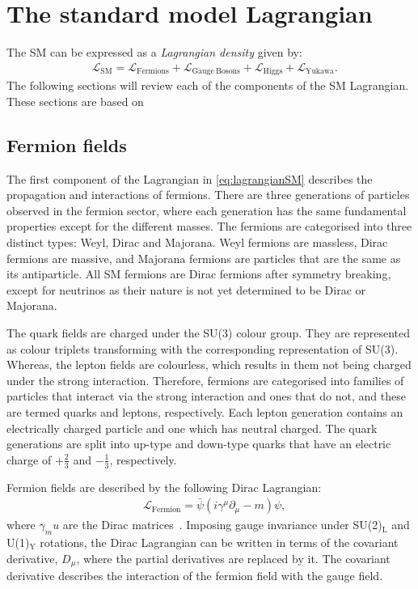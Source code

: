 \section{The standard model Lagrangian}
The SM can be expressed as a \emph{Lagrangian density} given by:
\begin{equation}
    \label{eq:lagrangianSM}
    \begin{aligned}
        & \mathcal{L}_\mathrm{SM} = \mathcal{L}_\mathrm{Fermions} + \mathcal{L}_\mathrm{Gauge~Bosons} + \mathcal{L}_\mathrm{Higgs} + \mathcal{L}_\mathrm{Yukawa}.
    \end{aligned}
\end{equation}
The following sections will review each of the components of the SM Lagrangian. These sections are based on ~\cite{Thomson:2013zua,Peskin:1995ev}

\subsection{Fermion fields}\label{sec:fermionFields}
The first component of the Lagrangian in \cref{eq:lagrangianSM} describes the propagation and interactions of fermions. There are three generations of particles observed in the fermion sector, where each generation has the same fundamental properties except for the different masses. The fermions are categorised into three distinct types: Weyl, Dirac and Majorana. Weyl fermions are massless, Dirac fermions are massive, and Majorana fermions are particles that are the same as its antiparticle. All SM fermions are Dirac fermions after symmetry breaking, except for neutrinos as their nature is not yet determined to be Dirac or Majorana. 

The quark fields are charged under the SU(3) colour group. They are represented as colour triplets transforming with the corresponding representation of SU(3). Whereas, the lepton fields are colourless, which results in them not being charged under the strong interaction. Therefore, fermions are categorised into families of particles that interact via the strong interaction and ones that do not, and these are termed quarks and leptons, respectively. Each lepton generation contains an electrically charged particle and one which has neutral charged. The quark generations are split into up-type and down-type quarks that have an electric charge of $+\frac{2}{3}$ and $-\frac{1}{3}$, respectively. 

Fermion fields are described by the following Dirac Lagrangian:
\begin{equation}
    \label{eq:lagrangianFermion}
    \begin{aligned}
        & \mathcal{L}_\mathrm{Fermion} = \bar{\psi}\left(i\gamma^\mu \partial_\mu - m\right)\psi,
    \end{aligned}
\end{equation}
where $\gamma_mu$ are the Dirac matrices~\cite{doi:10.1098/rspa.1928.0023}. Imposing gauge invariance under SU(2)$_\mathrm{L}$ and U(1)$_\mathrm{Y}$ rotations, the Dirac Lagrangian can be written in terms of the covariant derivative, $D_\mu$, where the partial derivatives are replaced by it. The covariant derivative describes the interaction of the fermion field with the gauge field. 

